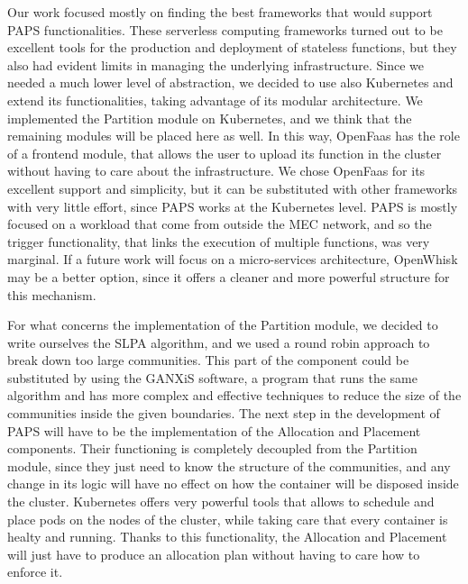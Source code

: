 Our work focused mostly on finding the best frameworks that would support PAPS functionalities.
These serverless computing frameworks turned out to be excellent tools for the production
and deployment of stateless functions, but they also had evident limits in managing the underlying
infrastructure.
Since we needed a much lower level of abstraction, we decided to use also Kubernetes and extend
its functionalities, taking advantage of its modular architecture.
We implemented the Partition module on Kubernetes, and we think that the remaining modules will
be placed here as well. In this way, OpenFaas has the role of a frontend module, that allows
the user to upload its function in the cluster without having to care about the infrastructure.
We chose OpenFaas for its excellent support and simplicity, but it can be substituted with other frameworks
with very little effort, since PAPS works at the Kubernetes level.
PAPS is mostly focused on a workload that come from outside the MEC network, and so the trigger functionality,
that links the execution of multiple functions, was very marginal.
If a future work will focus on a micro-services architecture, OpenWhisk may be
a better option, since it offers a cleaner and more powerful structure for this mechanism.
\par
For what concerns the implementation of the Partition module, we decided to write ourselves 
the SLPA algorithm, and we used a round robin approach to break down too large communities.
This part of the component could be substituted by using the GANXiS \cite{GANXis} software, a program
that runs the same algorithm and has more complex and effective techniques to reduce
the size of the communities inside the given boundaries.
The next step in the development of PAPS will have to be the implementation of the Allocation 
and Placement components. Their functioning is completely decoupled from the Partition module,
since they just need to know the structure of the communities, and any change in its logic
will have no effect on how the container will be disposed inside the cluster.
Kubernetes offers very powerful tools that allows to schedule and place pods on the nodes of the cluster,
while taking care that every container is healty and running. Thanks to this functionality,
the Allocation and Placement will just have to produce an allocation plan without having to
care how to enforce it.
